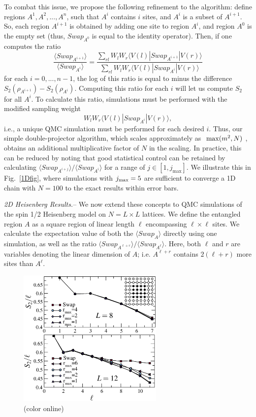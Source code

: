 \documentclass[prl,aps,twocolumn,floatfix,amsmath,amssymb,superscriptaddress,tightenlines]{revtex4}
\begin{document}
To combat this issue, we propose the following refinement to the algorithm: define regions $A^1,A^2,...,A^n$, such
that $A^i$ contains $i$ sites, and $A^i$ is a subset of $A^{i+1}$.  So, each region $A^{i+1}$ is obtained by adding one site to region
$A^{i}$, and region $A^0$ is the empty set (thus, $Swap_{A^0}$ is equal to the identity operator).
Then, if one computes the ratio
\begin{equation}
\frac{\langle Swap_{A^{i+1}}\rangle}{\langle Swap_{A^{i}}\rangle}
= \frac{\sum_{rl} W_l W_r \langle V(l) | Swap_{A^{i+1}} | V(r) \rangle} {\sum_{rl} W_l W_r \langle V(l) | Swap_{A^i} | V(r) \rangle}
\end{equation}
for each $i=0,...,n-1$, the log of this ratio is equal to minus the
difference $S_2(\rho_{A^{i+1}})-S_2(\rho_{A^{i}})$.
Computing this ratio for each $i$ will let us compute $S_2$ for all $A^i$.  To calculate this ratio, simulations must be performed 
with the modified sampling weight
\begin{equation}
W_l W_r \langle V(l) | Swap_{A^i} | V(r) \rangle,
\end{equation}
i.e., a unique QMC simulation must be performed for each desired $i$.  Thus, our simple double-projector algorithm, which scales 
approximately as $~{\rm max}(m^2, N)$ \cite{AWSloop}, obtains an additional multiplicative factor of $N$ in the scaling.  In practice, 
this can be reduced by noting that good statistical control can be retained by calculating 
${\langle Swap_{A^{i+j}}\rangle}/{\langle Swap_{A^{i}}\rangle}$ for a range of $j \in [1,j_{\max}]$.  We illustrate this in Fig.~\ref{1Dfig},
where simulations with $j_{\rm max}=5$ are sufficient to converge a 1D chain with $N=100$ to the exact results within error bars.

{\it 2D Heisenberg Results.}-- We now extend these concepts to QMC simulations of the spin 1/2 Heisenberg model on $N=L \times L$ lattices.  We define the entangled region $A$ as a square region of linear length $\ell$ encompassing $\ell \times \ell$ sites.  We calculate the expectation value of both the $\langle Swap_A \rangle$ directly using one simulation, as well as the ratio ${\langle Swap_{A^{\ell+r}}\rangle}/{\langle Swap_{A^{\ell}}\rangle}$.  Here, both $\ell$ and $r$ are variables denoting the linear dimension of $A$; i.e. $A^{\ell+r}$ contains $2(\ell+r)$ more sites than $A^{\ell}$.

\begin{figure} {
\includegraphics[width=2.8in]{L8n12_ratio.eps} \caption{(color online) 
\label{L16fig}
}
} \end{figure}
\end{document}
